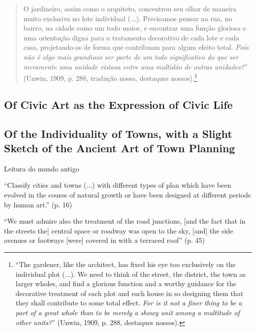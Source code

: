 \documentclass[12pt, a4paper]{book} %
\begin{document}
        \begin{quotation}
            O jardineiro, assim como o arquiteto, concentrou seu olhar de maneira muito exclusiva no lote individual (...). Precisamos pensar na rua, no bairro, na cidade como um todo maior, e encontrar uma função gloriosa e uma orientação digna para o tratamento decorativo de cada lote e cada casa, projetando-os de forma que contribuam para algum efeito total. \textit{Pois não é algo mais grandioso ser parte de um todo significativo do que ser meramente uma unidade vistosa entre uma multidão de outras unidades?}'' (Unwin, 1909, p. 288, tradução nossa, destaques nossos).\footnote[99]{``The gardener, like the architect, has fixed his eye too exclusively on the individual plot (...). We need to think of the street, the district, the town as larger wholes, and find a glorious function and a worthy guidance for the decorative treatment of each plot and each house in so designing them that they shall contribute to some total effect. \textit{For is it not a finer thing to be a part of a great whole than to be merely a showy unit among a multitude of other units?}'' (Unwin, 1909, p. 288, destaques nossos).}
        \end{quotation}
        

        













        \subsection*{Of Civic Art as the Expression of Civic Life}
        \subsection*{Of the Individuality of Towns, with a Slight Sketch of the Ancient Art of Town Planning}

        Leitura do mundo antigo

        ``Classify cities and towns (...) with different types of plan which have been evolved in the course of natural growth or have been designed at different periods by human art.'' (p. 16)

        ``We must admire also the treatment of the road junctions, [and the fact that in the streets the] central space or roadway was open to the sky, [and] the side avenues or footways [were] covered in with a terraced roof'' (p. 45)
\end{document}
